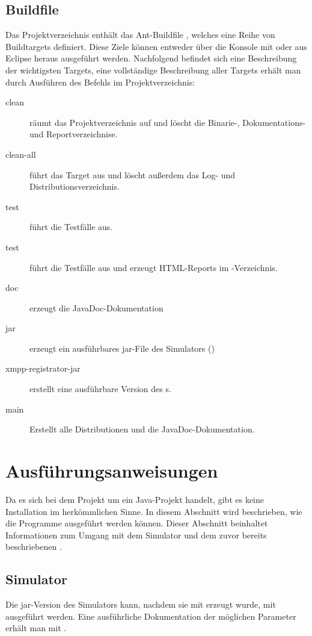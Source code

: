 \subsection{Buildfile}
Das Projektverzeichnis enthält das Ant-Buildfile , welches eine Reihe von Buildtargets definiert. Diese Ziele können entweder über die Konsole mit  oder aus Eclipse heraus ausgeführt werden. Nachfolgend befindet sich eine Beschreibung der wichtigsten Targets, eine vollständige Beschreibung aller Targets erhält man durch Ausführen des Befehls  im Projektverzeichnis:
\begin{description}
	\item[clean] räumt das Projektverzeichnis auf und löscht die Binarie-, Dokumentations- und Reportverzeichnise.
	\item[clean-all] führt das Target  aus und löscht außerdem das Log- und Distributionsverzeichnis.
	\item[test] führt die Testfälle aus.
	\item[test] führt die Testfälle aus und erzeugt HTML-Reports im -Verzeichnis.
	\item[doc] erzeugt die JavaDoc-Dokumentation
	\item[jar] erzeugt ein ausführbares jar-File des Simulators ()
	\item[xmpp-registrator-jar] erstellt eine ausführbare Version des s.
	\item[main] Erstellt alle Distributionen und die JavaDoc-Dokumentation.
\end{description}

\section{Ausführungsanweisungen}\label{sec:appendix_install}
Da es sich bei dem Projekt um ein Java-Projekt handelt, gibt es keine Installation im herkömmlichen Sinne. In diesem Abschnitt wird beschrieben, wie die Programme ausgeführt werden können. Dieser Abschnitt beinhaltet Informationen zum Umgang mit dem Simulator und dem zuvor bereits beschriebenen .
\subsection{Simulator}
Die jar-Version des Simulators kann, nachdem sie mit  erzeugt wurde, mit  ausgeführt werden. Eine ausführliche Dokumentation der möglichen Parameter erhält man mit .
